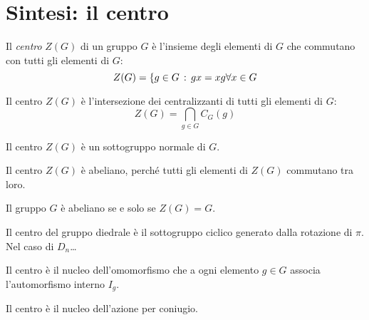 \chapter{Sintesi: il centro}
\label{ch:sintesi_centro}

Il \emph{centro} $Z(G)$ di un gruppo $G$ è l'insieme degli elementi di $G$ che commutano con tutti gli elementi di $G$:
\begin{equation*}
    Z(G) = \{g \in G \,:\, gx = xg \forall x \in G
\end{equation*}

Il centro $Z(G)$ è l'intersezione dei centralizzanti di tutti gli elementi di $G$:
\begin{equation*}
    Z(G) = \bigcap_{g \in G} C_G(g)
\end{equation*}

Il centro $Z(G)$ è un sottogruppo normale di $G$.

\bigskip
Il centro $Z(G)$ è abeliano, perché tutti gli elementi di $Z(G)$ commutano tra loro.

\bigskip
Il gruppo $G$ è abeliano se e solo se $Z(G) = G$.

\bigskip
Il centro del gruppo diedrale è il sottogruppo ciclico generato dalla rotazione di $\pi$.
Nel caso di $D_n$\dots

\bigskip
Il centro è il nucleo dell'omomorfismo che a ogni elemento $g \in G$ associa l'automorfismo interno $I_g$.

\bigskip
Il centro è il nucleo dell'azione per coniugio.